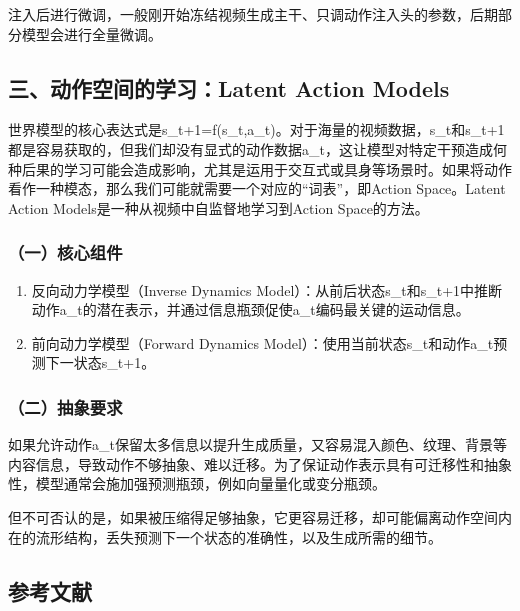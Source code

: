 注入后进行微调，一般刚开始冻结视频生成主干、只调动作注入头的参数，后期部分模型会进行全量微调。

\hypertarget{ux4e09ux52a8ux4f5cux7a7aux95f4ux7684ux5b66ux4e60latent-action-models}{%
\subsection{三、动作空间的学习：Latent Action Models}\label{ux4e09ux52a8ux4f5cux7a7aux95f4ux7684ux5b66ux4e60latent-action-models}}

世界模型的核心表达式是s\_t+1=f(s\_t,a\_t)。对于海量的视频数据，s\_t和s\_t+1都是容易获取的，但我们却没有显式的动作数据a\_t，这让模型对特定干预造成何种后果的学习可能会造成影响，尤其是运用于交互式或具身等场景时。如果将动作看作一种模态，那么我们可能就需要一个对应的``词表''，即Action Space。Latent Action Models是一种从视频中自监督地学习到Action Space的方法。

\hypertarget{ux4e00ux6838ux5fc3ux7ec4ux4ef6}{%
\subsubsection{（一）核心组件}\label{ux4e00ux6838ux5fc3ux7ec4ux4ef6}}

\begin{enumerate}
\def\labelenumi{\arabic{enumi}.}
\item
  反向动力学模型（Inverse Dynamics Model）：从前后状态s\_t和s\_t+1中推断动作a\_t的潜在表示，并通过信息瓶颈促使a\_t编码最关键的运动信息。
\item
  前向动力学模型（Forward Dynamics Model）：使用当前状态s\_t和动作a\_t预测下一状态s\_t+1。
\end{enumerate}

\hypertarget{ux4e8cux62bdux8c61ux8981ux6c42}{%
\subsubsection{（二）抽象要求}\label{ux4e8cux62bdux8c61ux8981ux6c42}}

如果允许动作a\_t保留太多信息以提升生成质量，又容易混入颜色、纹理、背景等内容信息，导致动作不够抽象、难以迁移。为了保证动作表示具有可迁移性和抽象性，模型通常会施加强预测瓶颈，例如向量量化或变分瓶颈。

但不可否认的是，如果被压缩得足够抽象，它更容易迁移，却可能偏离动作空间内在的流形结构，丢失预测下一个状态的准确性，以及生成所需的细节。

\FloatBarrier
{}
\hypertarget{ux53c2ux8003ux6587ux732e-155}{%
\subsection{参考文献}\label{ux53c2ux8003ux6587ux732e-155}}

